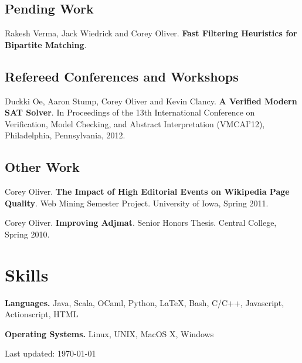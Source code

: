 \documentclass[10pt,letterpaper]{article}
\renewenvironment{itemize}{
  \begin{list}{}{
      \setlength{\leftmargin}{1.5em}
      \setlength{\itemsep}{0.25em}
      \setlength{\parskip}{0pt}
      \setlength{\parsep}{0.25em}
    }
  }{
  \end{list}
}
\begin{document}
\subsection*{Pending Work}

\begin{itemize}
\item Rakesh Verma, Jack Wiedrick and Corey Oliver. \textbf{Fast
    Filtering Heuristics for Bipartite Matching}.
\end{itemize}

\subsection*{Refereed Conferences and Workshops}

\begin{itemize}
  {\item Duckki Oe, Aaron Stump, Corey Oliver and Kevin
    Clancy. \textbf{A Verified Modern SAT Solver}. In Proceedings of
    the 13th International Conference on Verification, Model Checking,
    and Abstract Interpretation (VMCAI'12), Philadelphia,
    Pennsylvania, 2012.}
\end{itemize}

\subsection*{Other Work}
\begin{itemize}
\item Corey Oliver. \textbf{The Impact of High Editorial Events on
    Wikipedia Page Quality}. Web Mining Semester Project. University
  of Iowa, Spring 2011.
\item Corey Oliver. \textbf{Improving Adjmat}. Senior Honors
  Thesis. Central College, Spring 2010.
\end{itemize}

\section*{Skills}
\begin{itemize}
\item \textbf{Languages.} Java, Scala, OCaml, Python, \LaTeX, Bash,
  C/C++, Javascript, Actionscript, HTML
\item \textbf{Operating Systems.} Linux, UNIX, MacOS X, Windows
\item
\end{itemize}
\medskip

\begin{center}
  \begin{small}
    Last updated: \today
  \end{small}
\end{center}
\end{document}
